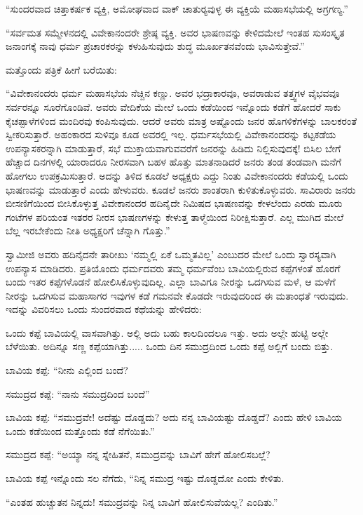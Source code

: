 “ಸುಂದರವಾದ ಚಿತ್ತಾಕರ್ಷಕ ವ್ಯಕ್ತಿ, ಅಮೋಘವಾದ ವಾಕ್ ಚಾತುರ‍್ಯವುಳ್ಳ ಈ ವ್ಯಕ್ತಿಯೆ ಮಹಾಸಭೆಯಲ್ಲಿ ಅಗ್ರಗಣ್ಯ.” 

 “ಸರ್ವಮತ ಸಮ್ಮೇಳನದಲ್ಲಿ ವಿವೇಕಾನಂದರೇ ಶ್ರೇಷ್ಠ ವ್ಯಕ್ತಿ. ಅವರ ಭಾಷಣವನ್ನು ಕೇಳಿದಮೇಲೆ ಇಂತಹ ಸುಸಂಸ್ಕೃತ ಜನಾಂಗಕ್ಕೆ ನಾವು ಧರ್ಮ ಪ್ರಚಾರಕರನ್ನು ಕಳುಹಿಸುವುದು ಶುದ್ಧ ಮೂರ್ಖತನವೆಂದು ಭಾವಿಸುತ್ತೇವೆ.” 

 ಮತ್ತೊಂದು ಪತ್ರಿಕೆ ಹೀಗೆ ಬರೆಯಿತು: 

 “ವಿವೇಕಾನಂದರು ಧರ್ಮ ಮಹಾಸಭೆಯ ನೆಚ್ಚಿನ ಕಣ್ಣು. ಅವರ ಭದ್ರಾಕಾರವೂ, ಅವರಾಡುವ ತತ್ತ್ವಗಳ ವೈಭವವೂ ಸರ್ವರನ್ನೂ ಸೂರೆಗೊಂಡಿವೆ. ಅವರು ವೇದಿಕೆಯ ಮೇಲೆ ಒಂದು ಕಡೆಯಿಂದ ಇನ್ನೊಂದು ಕಡೆಗೆ ಹೋದರೆ ಸಾಕು ಕೈಚಪ್ಪಾಳೆಗಳಿಂದ ಮಂದಿರವು ಕಂಪಿಸುವುದು. ಆದರೆ ಅವರು ಮಾತ್ರ ಅಷ್ಟೊಂದು ಜನರ ಹೊಗಳಿಕೆಗಳನ್ನು ಬಾಲಕರಂತೆ ಸ್ವೀಕರಿಸುತ್ತಾರೆ. ಅಹಂಕಾರದ ಸುಳಿವೂ ಕೂಡ ಅವರಲ್ಲಿ ಇಲ್ಲ. ಧರ್ಮಸಭೆಯಲ್ಲಿ ವಿವೇಕಾನಂದರನ್ನು ಕಟ್ಟಕಡೆಯ ಉಪನ್ಯಾಸಕರನ್ನಾಗಿ ಮಾಡುತ್ತಾರೆ, ಸಭೆ ಮುಕ್ತಾಯವಾಗುವವರೆಗೆ ಜನರನ್ನು ಹಿಡಿದು ನಿಲ್ಲಿಸುವುದಕ್ಕೆ! ಬಿಸಿಲ ಬೇಗೆ ಹೆಚ್ಚಾದ ದಿನಗಳಲ್ಲಿ ಯಾರಾದರೂ ನೀರಸವಾಗಿ ಬಹಳ ಹೊತ್ತು ಮಾತನಾಡಿದರೆ ಜನರು ತಂಡ ತಂಡವಾಗಿ ಮನೆಗೆ ಹೋಗಲು ಉಪಕ್ರಮಿಸುತ್ತಾರೆ. ಅದನ್ನು ತಿಳಿದ ಕೂಡಲೆ ಅಧ್ಯಕ್ಷರು ಎದ್ದು ನಿಂತು ವಿವೇಕಾನಂದರು ಕಡೆಯಲ್ಲಿ ಒಂದು ಭಾಷಣವನ್ನು ಮಾಡುತ್ತಾರೆ ಎಂದು ಹೇಳುವರು. ಕೂಡಲೆ ಜನರು ಶಾಂತರಾಗಿ ಕುಳಿತುಕೊಳ್ಳುವರು. ಸಾವಿರಾರು ಜನರು ಬೀಸಣಿಗೆಯಿಂದ ಬೀಸಿಕೊಳ್ಳುತ್ತ ವಿವೇಕಾನಂದರ ಹದಿನೈದೇ ನಿಮಿಷದ ಭಾಷಣವನ್ನು ಕೇಳಲೆಂದು ಎರಡು ಮೂರು ಗಂಟೆಗಳ ಪರಿಯಂತ ಇತರರ ನೀರಸ ಭಾಷಣಗಳನ್ನು ಕೇಳುತ್ತ ತಾಳ್ಮೆಯಿಂದ ನಿರೀಕ್ಷಿಸುತ್ತಾರೆ. ಎಲ್ಲ ಮುಗಿದ ಮೇಲೆ ಬೆಲ್ಲ ಇರಬೇಕೆಂದು ನೀತಿ ಅಧ್ಯಕ್ಷರಿಗೆ ಚೆನ್ನಾಗಿ ಗೊತ್ತು.” 

 ಸ್ವಾಮೀಜಿ ಅವರು ಹದಿನೈದನೇ ತಾರೀಖು ‘ನಮ್ಮಲ್ಲಿ ಏಕೆ ಒಮ್ಮತವಿಲ್ಲ’ ಎಂಬುದರ ಮೇಲೆ ಒಂದು ಸ್ವಾರಸ್ಯವಾಗಿ ಉಪನ್ಯಾಸ ಮಾಡಿದರು. ಪ್ರತಿಯೊಂದು ಧರ್ಮದವರು ತಮ್ಮ ಧರ್ಮವೆಂಬ ಬಾವಿಯಲ್ಲಿರುವ ಕಪ್ಪೆಗಳಂತೆ ಹೊರಗೆ ಬಂದು ಇತರ ಕಪ್ಪೆಗಳೊಡನೆ ಹೋಲಿಸಿಕೊಳ್ಳುವುದಿಲ್ಲ. ಎಲ್ಲಾ ಬಾವಿಗೂ ನೀರನ್ನು ಒದಗಿಸುವ ಮಳೆ, ಆ ಮಳೆಗೆ ನೀರನ್ನು ಒದಗಿಸುವ ಮಹಾಸಾಗರ ಇವುಗಳ ಕಡೆ ಗಮನವೇ ಕೊಡದೇ ಇರುವುದರಿಂದ ಈ ಮತಾಂಧತೆ ಇರುವುದು. ಇದನ್ನು ವಿವರಿಸಲು ಒಂದು ಸುಂದರವಾದ ಕಥೆಯನ್ನು ಹೇಳಿದರು: 

 ಒಂದು ಕಪ್ಪೆ ಬಾವಿಯಲ್ಲಿ ವಾಸವಾಗಿತ್ತು. ಅಲ್ಲಿ ಅದು ಬಹು ಕಾಲದಿಂದಲೂ ಇತ್ತು. ಅದು ಅಲ್ಲೇ ಹುಟ್ಟಿ ಅಲ್ಲೇ ಬೆಳೆಯಿತು. ಅದಿನ್ನೂ ಸಣ್ಣ ಕಪ್ಪೆಯಾಗಿತ್ತು..... ಒಂದು ದಿನ ಸಮುದ್ರದಿಂದ ಒಂದು ಕಪ್ಪೆ ಅಲ್ಲಿಗೆ ಬಂದು ಬಿತ್ತು. 

 ಬಾವಿಯ ಕಪ್ಪೆ: “ನೀನು ಎಲ್ಲಿಂದ ಬಂದೆ? 

 ಸಮುದ್ರದ ಕಪ್ಪೆ: “ನಾನು ಸಮುದ್ರದಿಂದ ಬಂದೆ” 

 ಬಾವಿಯ ಕಪ್ಪೆ: “ಸಮುದ್ರವೇ! ಅದೆಷ್ಟು ದೊಡ್ಡದು? ಅದು ನನ್ನ ಬಾವಿಯಷ್ಟು ದೊಡ್ಡದೆ? ಎಂದು ಹೇಳಿ ಬಾವಿಯ ಒಂದು ಕಡೆಯಿಂದ ಮತ್ತೊಂದು ಕಡೆ ನೆಗೆಯಿತು.”

 ಸಮುದ್ರದ ಕಪ್ಪೆ: “ಅಯ್ಯಾ ನನ್ನ ಸ್ನೇಹಿತನೆ, ಸಮುದ್ರವನ್ನು ಬಾವಿಗೆ ಹೇಗೆ ಹೋಲಿಸಬಲ್ಲೆ? 

 ಬಾವಿಯ ಕಪ್ಪೆ ಇನ್ನೊಂದು ಸಲ ನೆಗೆದು, “ನಿನ್ನ ಸಮುದ್ರ ಇಷ್ಟು ದೊಡ್ಡದೋ ಎಂದು ಕೇಳಿತು. 

 “ಎಂತಹ ಹುಚ್ಚುತನ ನಿನ್ನದು! ಸಮುದ್ರವನ್ನು ನಿನ್ನ ಬಾವಿಗೆ ಹೋಲಿಸುವೆಯಲ್ಲ? ಎಂದಿತು.” 


